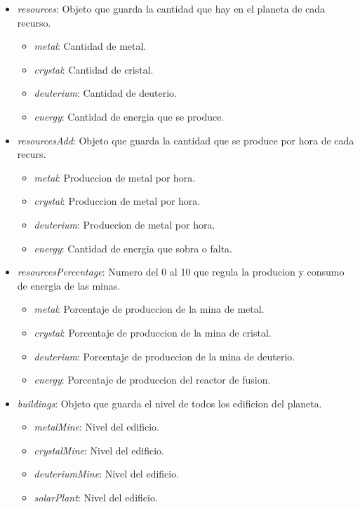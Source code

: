 \documentclass{article}
\begin{document}
\begin{itemize}[noitemsep]
    \item \textit{resources}: Objeto que guarda la cantidad que hay en el planeta de cada recurso.
    \begin{itemize}[noitemsep]
        \item \textit{metal}: Cantidad de metal.
        \item \textit{crystal}: Cantidad de cristal.
        \item \textit{deuterium}: Cantidad de deuterio.
        \item \textit{energy}: Cantidad de energia que se produce.
    \end{itemize}
    \item \textit{resourcesAdd}: Objeto que guarda la cantidad que se produce por hora de cada recurs.
    \begin{itemize}[noitemsep]
        \item \textit{metal}: Produccion de metal por hora.
        \item \textit{crystal}: Produccion de metal por hora.
        \item \textit{deuterium}: Produccion de metal por hora.
        \item \textit{energy}: Cantidad de energia que sobra o falta.
    \end{itemize}
    \item \textit{resourcesPercentage}: Numero del 0 al 10 que regula la producion y consumo de energia de las minas.
    \begin{itemize}[noitemsep]
        \item \textit{metal}: Porcentaje de produccion de la mina de metal.
        \item \textit{crystal}: Porcentaje de produccion de la mina de cristal.
        \item \textit{deuterium}: Porcentaje de produccion de la mina de deuterio.
        \item \textit{energy}: Porcentaje de produccion del reactor de fusion.
    \end{itemize}
    \item \textit{buildings}: Objeto que guarda el nivel de todos los edificion del planeta.
    \begin{itemize}[noitemsep]
        \item \textit{metalMine}: Nivel del edificio.
        \item \textit{crystalMine}: Nivel del edificio.
        \item \textit{deuteriumMine}: Nivel del edificio.
        \item \textit{solarPlant}: Nivel del edificio.

\end{itemize}
\end{itemize}
\end{document}
